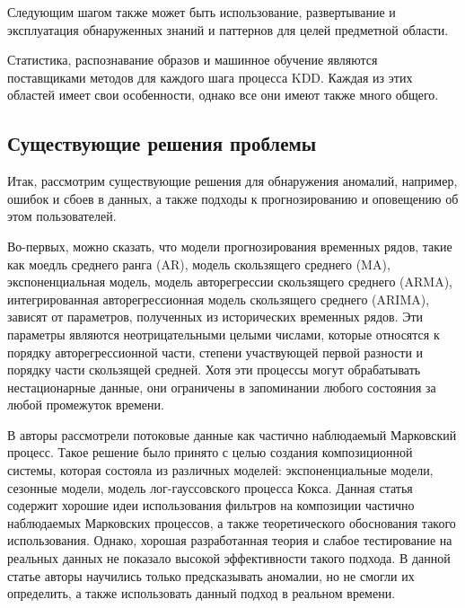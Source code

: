 Следующим шагом также может быть использование, развертывание и эксплуатация обнаруженных знаний и паттернов для целей предметной области.

Статистика, распознавание образов и машинное обучение являются поставщиками методов для каждого шага процесса KDD.
Каждая из этих областей имеет свои особенности, однако все они имеют также много общего.

\subsection{Существующие решения проблемы}

Итак, рассмотрим существующие решения для обнаружения аномалий, например, ошибок и сбоев в данных, а также
подходы к прогнозированию и оповещению об этом пользователей.


Во-первых, можно сказать, что модели прогнозирования временных рядов, такие как моедль среднего ранга (AR),
модель скользящего среднего (MA), экспоненциальная модель,
модель авторегрессии скользящего среднего (ARMA), 
интегрированная авторегрессионная модель скользящего среднего (ARIMA), 
зависят от параметров, полученных из исторических временных рядов. 
Эти параметры являются неотрицательными целыми числами, 
которые относятся к порядку авторегрессионной части, степени участвующей первой разности и порядку части скользящей средней. 
Хотя эти процессы могут обрабатывать нестационарные данные, 
они ограничены в запоминании любого состояния за любой промежуток времени. \cite{nonlinear-series}

В \cite{3-paper} авторы рассмотрели потоковые данные как частично наблюдаемый Марковский процесс. \cite{3-pomp}
Такое решение было принято с целью создания композиционной системы,
которая состояла из различных моделей: экспоненциальные модели, сезонные модели, модель лог-гауссовского процесса Кокса.
Данная статья содержит хорошие идеи использования фильтров на композиции частично наблюдаемых Марковских процессов, а также
теоретического обоснования такого использования. Однако, хорошая разработанная теория и слабое тестирование на реальных данных
не показало высокой эффективности такого подхода. В данной статье авторы научились только предсказывать аномалии,
но не смогли их определить, а также использовать данный подход в реальном времени.

